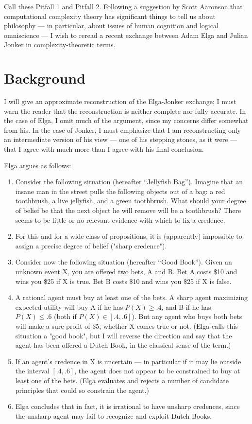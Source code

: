 \documentclass[letterpaper,12pt]{article}
\begin{document}
Call these Pitfall 1 and Pitfall 2. Following a suggestion by Scott Aaronson that computational complexity theory has significant things to tell us about philosophy --- in particular, about issues of human cognition and logical omniscience --- I wish to reread a recent exchange between Adam Elga and Julian Jonker in complexity-theoretic terms.

\section{Background}
I will give an approximate reconstruction of the Elga-Jonker exchange; I must warn the reader that the reconstruction is neither complete nor fully accurate. In the case of Elga, I omit much of the argument, since my concerns differ somewhat from his. In the case of Jonker, I must emphasize that I am reconstructing only an intermediate version of his view --- one of his stepping stones, as it were --- that I agree with much more than I agree with his final conclusion.

Elga argues as follows:

\begin{enumerate}
\item
Consider the following situation (hereafter ``Jellyfish Bag''). Imagine that an insane man in the street pulls the following objects out of a bag: a red toothbrush, a live jellyfish, and a green toothbrush. What should your degree of belief be that the next object he will remove will be a toothbrush? There seems to be little or no relevant evidence with which to fix a credence.
\item
For this and for a wide class of propositions, it is (apparently) impossible to assign a precise degree of belief ("sharp credence").
\item
Consider now the following situation (hereafter ``Good Book''). Given an unknown event X, you are offered two bets, A and B. Bet A costs \$10 and wins you \$25 if X is true. Bet B costs \$10 and wins you \$25 if X is false.
\item
A rational agent must buy at least one of the bets. A sharp agent maximizing expected utility will buy A if he has $P(X) \geq .4$, and B if he has $P(X) \leq .6$ (both if $P(X) \in [.4, .6]$). But any agent who buys both bets will make a sure profit of \$5, whether X comes true or not. (Elga calls this situation a "good book", but I will reverse the direction and say that the agent has been offered a Dutch Book, in the classical sense of the term.)
\item
If an agent's credence in X is uncertain --- in particular if it may lie outside the interval $[.4, .6]$, the agent does not appear to be constrained to buy at least one of the bets. (Elga evaluates and rejects a number of candidate principles that could so constrain the agent.)
\item
Elga concludes that in fact, it is irrational to have unsharp credences, since the unsharp agent may fail to recognize and exploit Dutch Books.
\end{enumerate}
\end{document}
